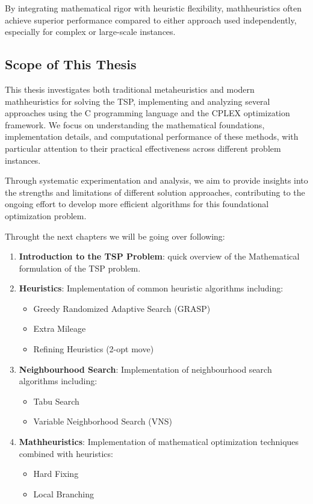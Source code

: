 \documentclass{article}
\begin{document}
By integrating mathematical rigor with heuristic flexibility, mathheuristics often achieve superior performance compared to either approach used independently, 
especially for complex or large-scale instances.

\subsection{Scope of This Thesis}
This thesis investigates both traditional metaheuristics and modern mathheuristics for solving the TSP, implementing and analyzing several 
approaches using the C programming language and the CPLEX optimization framework. We focus on understanding the mathematical foundations, implementation details, 
and computational performance of these methods, with particular attention to their practical effectiveness across different problem instances.

Through systematic experimentation and analysis, we aim to provide insights into the strengths and limitations of different solution approaches, contributing to the 
ongoing effort to develop more efficient algorithms for this foundational optimization problem.

Throught the next chapters we will be going over following:
\begin{enumerate}
	\item \textbf{Introduction to the TSP Problem}: quick overview of the Mathematical formulation of the TSP problem.
	\item \textbf{Heuristics}: Implementation of common heuristic algorithms including:
		\begin{itemize}
			\item Greedy Randomized Adaptive Search (GRASP)
			\item Extra Mileage
			\item Refining Heuristics (2-opt move)
		\end{itemize}
	\item \textbf{Neighbourhood Search}: Implementation of neighbourhood search algorithms including:
		\begin{itemize}
			\item Tabu Search
			\item Variable Neighborhood Search (VNS)
		\end{itemize}
	\item \textbf{Mathheuristics}: Implementation of mathematical optimization techniques combined with heuristics:
		\begin{itemize}
			\item Hard Fixing
			\item Local Branching
		\end{itemize}
\end{enumerate}
\end{document}
